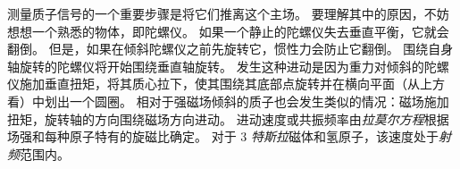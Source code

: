 测量质子信号的一个重要步骤是将它们推离这个主场。
要理解其中的原因，不妨想想一个熟悉的物体，即陀螺仪。
如果一个静止的陀螺仪失去垂直平衡，它就会翻倒。
但是，如果在倾斜陀螺仪之前先旋转它，惯性力会防止它翻倒。
围绕自身轴旋转的陀螺仪将开始围绕垂直轴旋转。
发生这种进动是因为重力对倾斜的陀螺仪施加垂直扭矩，将其质心拉下，使其围绕其底部点旋转并在横向平面（从上方看）中划出一个圆圈。 
相对于强磁场倾斜的质子也会发生类似的情况：磁场施加扭矩，旋转轴的方向围绕磁场方向进动。
进动速度或共振频率由\textit{拉莫尔方程}根据场强和每种原子特有的旋磁比确定。 
对于 3 \textit{特斯拉}磁体和氢原子，该速度处于\textit{射频}范围内。



